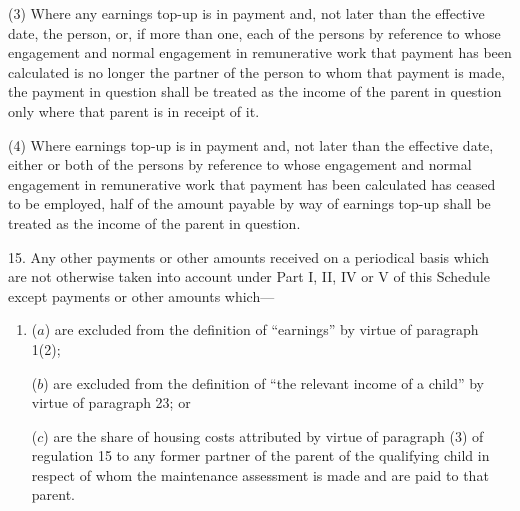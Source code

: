 \documentclass[12pt,a4paper]{article}
\begin{document}
(3) Where any earnings top-up is in payment and, not later than the effective date, the person, or, if more than one, each of the persons by reference to whose engagement and normal engagement in remunerative work that payment has been calculated is no longer the partner of the person to whom that payment is made, the payment in question shall be treated as the income of the parent in question only where that parent is in receipt of it.

(4) Where earnings top-up is in payment and, not later than the effective date, either or both of the persons by reference to whose engagement and normal engagement in remunerative work that payment has been calculated has ceased to be employed, half of the amount payable by way of earnings top-up shall be treated as the income of the parent in question.



\medskip

15.  Any other payments or other amounts received on a periodical basis which are not otherwise taken into account under Part I, II, IV or V of this Schedule
except payments or other amounts which—
\begin{enumerate}\item[]
($a$) are excluded from the definition of “earnings” by virtue of paragraph 1(2);

($b$) are excluded from the definition of “the relevant income of a child” by virtue of paragraph 23; or

($c$) are the share of housing costs attributed by virtue of paragraph (3) of regulation 15 to any former partner of the parent of the qualifying child in respect of whom the maintenance assessment is made and are paid to that parent.
\end{enumerate}  %


\medskip
\end{document}
